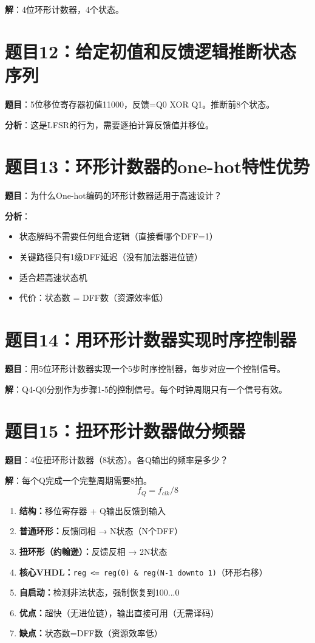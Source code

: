 \textbf{解}：4位环形计数器，4个状态。

\section*{题目12：给定初值和反馈逻辑推断状态序列}

\textbf{题目}：5位移位寄存器初值11000，反馈=Q0 XOR Q1。推断前8个状态。

\textbf{分析}：这是LFSR的行为，需要逐拍计算反馈值并移位。

\section*{题目13：环形计数器的one-hot特性优势}

\textbf{题目}：为什么One-hot编码的环形计数器适用于高速设计？

\textbf{分析}：
\begin{itemize}
  \item 状态解码不需要任何组合逻辑（直接看哪个DFF=1）
  \item 关键路径只有1级DFF延迟（没有加法器进位链）
  \item 适合超高速状态机
  \item 代价：状态数 = DFF数（资源效率低）
\end{itemize}

\section*{题目14：用环形计数器实现时序控制器}

\textbf{题目}：用5位环形计数器实现一个5步时序控制器，每步对应一个控制信号。

\textbf{解}：Q4-Q0分别作为步骤1-5的控制信号。每个时钟周期只有一个信号有效。

\section*{题目15：扭环形计数器做分频器}

\textbf{题目}：4位扭环形计数器（8状态）。各Q输出的频率是多少？

\textbf{解}：每个Q完成一个完整周期需要8拍。
$$f_Q = f_{clk} / 8$$

\begin{examtip}[环形计数器类题目的统一解法]
\begin{enumerate}
  \item \textbf{结构：}移位寄存器 + Q输出反馈到输入
  \item \textbf{普通环形：}反馈同相 → N状态（N个DFF）
  \item \textbf{扭环形（约翰逊）：}反馈反相 → 2N状态
  \item \textbf{核心VHDL：}\texttt{reg <= reg(0) \& reg(N-1 downto 1)}（环形右移）
  \item \textbf{自启动：}检测非法状态，强制恢复到100...0
  \item \textbf{优点：}超快（无进位链），输出直接可用（无需译码）
  \item \textbf{缺点：}状态数=DFF数（资源效率低）
\end{enumerate}
\end{examtip}
